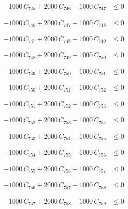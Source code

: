 \documentclass[a4paper,11pt]{article}
\begin{document}
\begin{align}
-1000\,C_{745} + 2000\,C_{746} - 1000\,C_{747} &\leq 0 \nonumber
\end{align}

\begin{align}
-1000\,C_{746} + 2000\,C_{747} - 1000\,C_{748} &\leq 0 \nonumber
\end{align}

\begin{align}
-1000\,C_{747} + 2000\,C_{748} - 1000\,C_{749} &\leq 0 \nonumber
\end{align}

\begin{align}
-1000\,C_{748} + 2000\,C_{749} - 1000\,C_{750} &\leq 0 \nonumber
\end{align}

\begin{align}
-1000\,C_{749} + 2000\,C_{750} - 1000\,C_{751} &\leq 0 \nonumber
\end{align}

\begin{align}
-1000\,C_{750} + 2000\,C_{751} - 1000\,C_{752} &\leq 0 \nonumber
\end{align}

\begin{align}
-1000\,C_{751} + 2000\,C_{752} - 1000\,C_{753} &\leq 0 \nonumber
\end{align}

\begin{align}
-1000\,C_{752} + 2000\,C_{753} - 1000\,C_{754} &\leq 0 \nonumber
\end{align}

\begin{align}
-1000\,C_{753} + 2000\,C_{754} - 1000\,C_{755} &\leq 0 \nonumber
\end{align}

\begin{align}
-1000\,C_{754} + 2000\,C_{755} - 1000\,C_{756} &\leq 0 \nonumber
\end{align}

\begin{align}
-1000\,C_{755} + 2000\,C_{756} - 1000\,C_{757} &\leq 0 \nonumber
\end{align}

\begin{align}
-1000\,C_{756} + 2000\,C_{757} - 1000\,C_{758} &\leq 0 \nonumber
\end{align}

\begin{align}
-1000\,C_{757} + 2000\,C_{758} - 1000\,C_{759} &\leq 0 \nonumber
\end{align}
\end{document}
